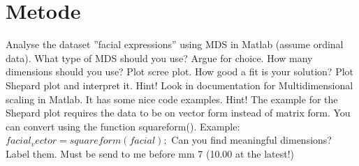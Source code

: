 \section*{Metode}
\label{Metode}
%

Analyse the dataset ”facial expressions” using MDS in Matlab (assume ordinal data).
What type of MDS should you use? Argue for choice. How many dimensions should you use? Plot scree plot.
How good a fit is your solution? Plot Shepard plot and interpret it.
Hint! Look in documentation for Multidimensional scaling in Matlab. It has some nice code examples.
Hint! The example for the Shepard plot requires the data to
be on vector form instead of matrix form. You can convert
using the function squareform(). Example: $facial_vector=squareform(facial);$
Can you find meaningful dimensions? Label them. Must be send to me before mm 7 (10.00 at the latest!)

